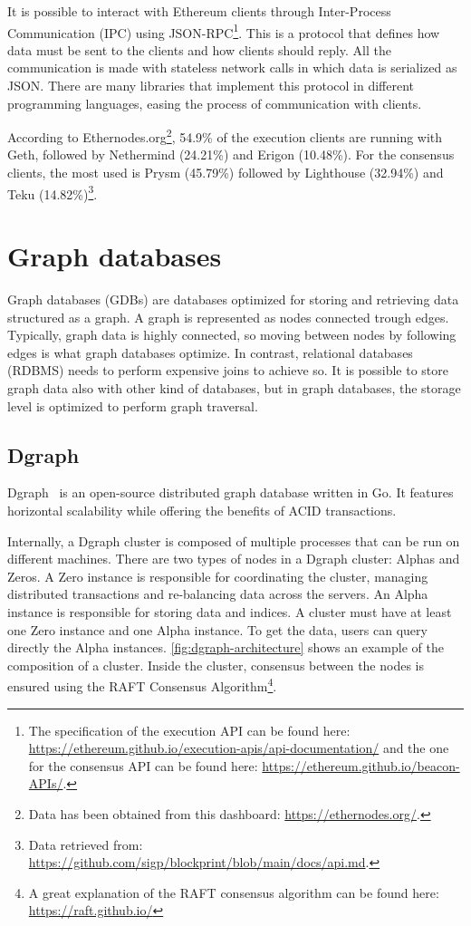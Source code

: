 It is possible to interact with Ethereum clients through Inter-Process Communication (IPC) using JSON-RPC\footnote{The specification of the execution API can be found here: \url{https://ethereum.github.io/execution-apis/api-documentation/} and the one for the consensus API can be found here: \url{https://ethereum.github.io/beacon-APIs/}.}. This is a protocol that defines how data must be sent to the clients and how clients should reply. All the communication is made with stateless network calls in which data is serialized as JSON. There are many libraries that implement this protocol in different programming languages, easing the process of communication with clients.

According to Ethernodes.org\footnote{Data has been obtained from this dashboard: \url{https://ethernodes.org/}.}, 54.9\% of the execution clients are running with Geth, followed by Nethermind (24.21\%) and Erigon (10.48\%). For the consensus clients, the most used is Prysm (45.79\%) followed by Lighthouse (32.94\%) and Teku (14.82\%)\footnote{Data retrieved from: \url{https://github.com/sigp/blockprint/blob/main/docs/api.md}.}.

\section{Graph databases}

Graph databases (GDBs) are databases optimized for storing and retrieving data structured as a graph. A graph is represented as nodes connected trough edges. Typically, graph data is highly connected, so moving between nodes by following edges is what graph databases optimize. In contrast, relational databases (RDBMS) needs to perform expensive joins to achieve so. It is possible to store graph data also with other kind of databases, but in graph databases, the storage level is optimized to perform graph traversal. 

\subsection{Dgraph}

Dgraph~\cite{dgraph} is an open-source distributed graph database written in Go. It features horizontal scalability while offering the benefits of ACID transactions.

Internally, a Dgraph cluster is composed of multiple processes that can be run on different machines. There are two types of nodes in a Dgraph cluster: Alphas and Zeros. A Zero instance is responsible for coordinating the cluster, managing distributed transactions and re-balancing data across the servers. An Alpha instance is responsible for storing data and indices. A cluster must have at least one Zero instance and one Alpha instance. To get the data, users can query directly the Alpha instances. \cref{fig:dgraph-architecture} shows an example of the composition of a cluster. Inside the cluster, consensus between the nodes is ensured using the RAFT Consensus Algorithm\footnote{A great explanation of the RAFT consensus algorithm can be found here: \url{https://raft.github.io/}}.

